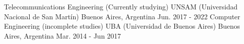 

\begin{cventries}

    \cventry
    {Telecommunications Engineering (Currently studying)} %
    {UNSAM (Universidad Nacional de San Martín)} %
    {Buenos Aires, Argentina} %
    {Jun. 2017 - 2022} %
    {}
    \cventry
    {Computer Engineering (incomplete studies)} %
    {UBA (Universidad de Buenos Aires)} %
    {Buenos Aires, Argentina} %
    {Mar. 2014 - Jun 2017}
    {}
\end{cventries}
